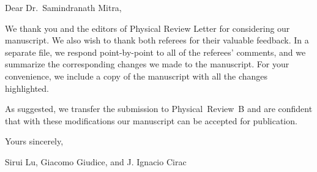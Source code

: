 \documentclass[a4paper,12pt]{article}
\begin{document}
Dear Dr.~Samindranath Mitra,
\vspace{3em}

We thank you and the editors of Physical Review Letter for considering our manuscript.
We also wish to thank both referees for their valuable feedback.
In a separate file, we respond point-by-point to all of the referees' comments, and we summarize the corresponding changes we made to the manuscript.
For your convenience, we include a copy of the manuscript with all the changes highlighted.

As suggested, we transfer the submission to Physical~Review~B and are confident that with these modifications our manuscript can be accepted for publication.

\vspace{3em}
Yours sincerely,
\vspace{1.5em}

Sirui Lu, Giacomo Giudice, and J. Ignacio Cirac
\end{document}
